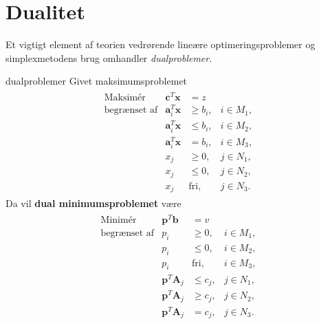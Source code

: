\newpage
\section{Dualitet}
%
Et vigtigt element af teorien vedrørende lineære optimeringsproblemer og simplexmetodens brug omhandler \textit{dualproblemer}.
%
\begin{defn}{}{dualproblemer}
Givet maksimumsproblemet
%
\begin{align*}
\begin{array}{lrll}
\text{Maksimér}		&\textbf{c}^T\textbf{x}	&=z			&\\
\text{begrænset af}	&\textbf{a}_i^T\textbf{x}	&\geq b_i,	&i \in M_1,\\
					&\textbf{a}_i^T\textbf{x}	&\leq b_i,	&i \in M_2,\\
					&\textbf{a}_i^T\textbf{x}	& = b_i,	&i \in M_3,\\
					&x_j					&\geq 0,	&j \in N_1,\\
					&x_j					&\leq 0,	&j \in N_2,\\							&x_j					&\text{fri},	&j \in N_3.
\end{array}
\end{align*}
%
Da vil \textbf{dual minimumsproblemet} være
%
\begin{align*}
\begin{array}{lrll}
\text{Minimér}		&\textbf{p}^T\textbf{b}	&=v			&\\
\text{begrænset af}	&p_i					&\geq 0,	&i \in M_1,\\
					&p_i					&\leq 0,	&i \in M_2,\\
					&p_i					&\text{fri},	&i \in M_3,\\
					&\textbf{p}^T\textbf{A}_j	&\leq c_j,	&j \in N_1,\\
					&\textbf{p}^T\textbf{A}_j	&\geq c_j,	&j \in N_2,\\
					&\textbf{p}^T\textbf{A}_j	& = c_j,	&j \in N_3.
\end{array}
\end{align*}
%
\end{defn}
